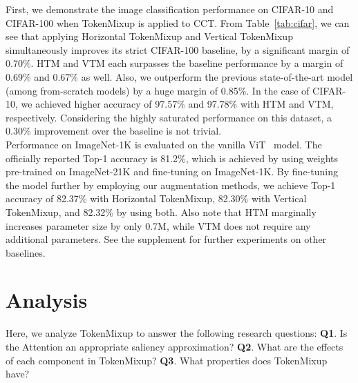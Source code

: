 \documentclass{article}
\begin{document}
 First, we demonstrate the image classification performance on CIFAR-10 and CIFAR-100 when TokenMixup is applied to CCT.
From Table~\ref{tab:cifar}, we can see that applying Horizontal TokenMixup and Vertical TokenMixup simultaneously improves its strict CIFAR-100 baseline, by a significant margin of 0.70\%.
HTM and VTM each surpasses the baseline performance by a margin of 0.69\% and 0.67\% as well.
Also, we outperform the previous state-of-the-art model (among from-scratch models) by a huge margin of 0.85\%.
In the case of CIFAR-10, we achieved higher accuracy of 97.57\% and 97.78\% with HTM and VTM, respectively.
Considering the highly saturated performance on this dataset, a 0.30\% improvement over the baseline is not trivial.\\
Performance on ImageNet-1K is evaluated on the vanilla ViT~\cite{dosovitskiy2020image} model.
The officially reported Top-1 accuracy is 81.2\%, which is achieved by using weights pre-trained on ImageNet-21K and fine-tuning on ImageNet-1K.
By fine-tuning the model further by employing our augmentation methods, we achieve Top-1 accuracy of 82.37\% with Horizontal TokenMixup, 82.30\% with Vertical TokenMixup, and 82.32\% by using both.
Also note that HTM marginally increases parameter size by only 0.7M, while VTM does not require any additional parameters.
See the supplement for further experiments on other baselines. %
 \section{Analysis}
\label{section:analysis}
Here, we analyze TokenMixup to answer the following research questions: 
\textbf{Q1}. Is the Attention  an appropriate saliency approximation? 
\textbf{Q2}. What are the effects of each component in TokenMixup? 
\textbf{Q3}. What properties does TokenMixup have? 
\end{document}
